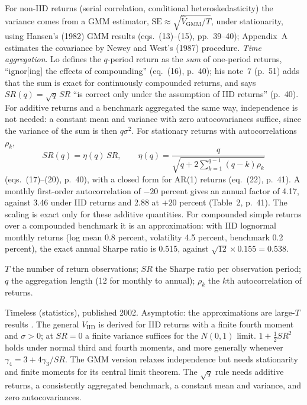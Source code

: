 \begin{qfmethod}
For non-IID returns (serial correlation, conditional heteroskedasticity) the variance comes from a GMM estimator, $\mathrm{SE}\approx\sqrt{\hat V_{\mathrm{GMM}}/T}$, under stationarity, using Hansen's (1982) GMM results (eqs.~(13)--(15), pp.~39--40); Appendix~A estimates the covariance by Newey and West's (1987) procedure. \emph{Time aggregation}. Lo defines the $q$-period return as the \emph{sum} of one-period returns, ``ignor[ing] the effects of compounding'' (eq.~(16), p.~40); his note~7 (p.~51) adds that the sum is exact for continuously compounded returns, and says $SR(q)=\sqrt q\,SR$ ``is correct only under the assumption of IID returns'' (p.~40). For additive returns and a benchmark aggregated the same way, independence is not needed: a constant mean and variance with zero autocovariances suffice, since the variance of the sum is then $q\sigma^2$. For stationary returns with autocorrelations $\rho_k$,
\[ SR(q)=\eta(q)\,SR,\qquad \eta(q)=\frac{q}{\sqrt{q+2\sum_{k=1}^{q-1}(q-k)\rho_k}} \]
(eqs.~(17)--(20), p.~40), with a closed form for AR(1) returns (eq.~(22), p.~41). A monthly first-order autocorrelation of $-20$ percent gives an annual factor of 4.17, against 3.46 under IID returns and 2.88 at $+20$ percent (Table~2, p.~41). The scaling is exact only for these additive quantities. For compounded simple returns over a compounded benchmark it is an approximation: with IID lognormal monthly returns (log mean 0.8 percent, volatility 4.5 percent, benchmark 0.2 percent), the exact annual Sharpe ratio is 0.515, against $\sqrt{12}\times0.155=0.538$.

 $T$ the number of return observations; $SR$ the Sharpe ratio per observation period; $q$ the aggregation length (12 for monthly to annual); $\rho_k$ the $k$th autocorrelation of returns.

 Timeless (statistics), published 2002. Asymptotic: the approximations are large-$T$ results \citep[p.~38]{wide-lo-sharpe}. The general $V_{\mathrm{IID}}$ is derived for IID returns with a finite fourth moment and $\sigma>0$; at $SR=0$ a finite variance suffices for the $N(0,1)$ limit. $1+\tfrac12SR^2$ holds under normal third and fourth moments, and more generally whenever $\gamma_4=3+4\gamma_3/SR$. The GMM version relaxes independence but needs stationarity and finite moments for its central limit theorem. The $\sqrt q$ rule needs additive returns, a consistently aggregated benchmark, a constant mean and variance, and zero autocovariances.


\end{qfmethod}
